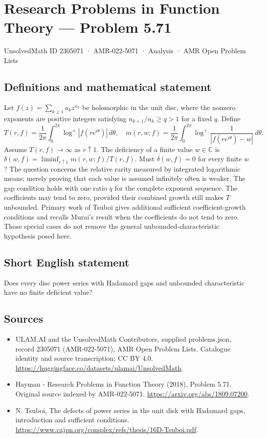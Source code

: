\documentclass[11pt,a4paper]{article}
\begin{document}
\section*{Research Problems in Function Theory — Problem 5.71}\label{2305071}
{\small UnsolvedMath ID 2305071 · AMR-022-5071 · Analysis · AMR Open Problem Lists}
\subsection{Definitions and mathematical statement}
Let $f(z)=\sum_{k\ge1}a_kz^{n_k}$ be holomorphic in the unit disc, where the nonzero exponents are positive integers satisfying $n_{k+1}/n_k\ge q>1$ for a fixed $q$. Define
\[
T(r,f)=\frac1{2\pi}\int_0^{2\pi}\log^+|f(re^{i\theta})|\,d\theta,
\quad
m(r,w;f)=\frac1{2\pi}\int_0^{2\pi}
\log^+\frac1{|f(re^{i\theta})-w|}\,d\theta.
\]
Assume $T(r,f)\to\infty$ as $r\uparrow1$. The deficiency of a finite value $w\in\mathbb C$ is
$\delta(w,f)=\liminf_{r\uparrow1}m(r,w;f)/T(r,f)$.
Must $\delta(w,f)=0$ for every finite $w$?
The question concerns the relative rarity measured by integrated logarithmic means; merely proving that each value is assumed infinitely often is weaker. The gap condition holds with one ratio $q$ for the complete exponent sequence. The coefficients may tend to zero, provided their combined growth still makes $T$ unbounded.
Primary work of Tsuboi gives additional sufficient coefficient-growth conditions and recalls Murai's result when the coefficients do not tend to zero. Those special cases do not remove the general unbounded-characteristic hypothesis posed here.
\subsection{Short English statement}
Does every disc power series with Hadamard gaps and unbounded characteristic have no finite deficient value?
\subsection{Sources}
\begin{itemize}
\item[S1] ULAM.AI and the UnsolvedMath Contributors, supplied problems.json, record 2305071 (AMR-022-5071), AMR Open Problem Lists. Catalogue identity and source transcription; CC BY 4.0.
\url{https://huggingface.co/datasets/ulamai/UnsolvedMath}.
\item[S2] Hayman - Research Problems in Function Theory (2018), Problem 5.71. Original source indexed by AMR-022-5071.
\url{https://arxiv.org/abs/1809.07200}.
\item[S3] N. Tsuboi, The defects of power series in the unit disk with Hadamard gaps, introduction and sufficient conditions.
\url{https://www.cajpn.org/complex/refs/thesis/16D-Tsuboi.pdf}.
\end{itemize}
\end{document}
